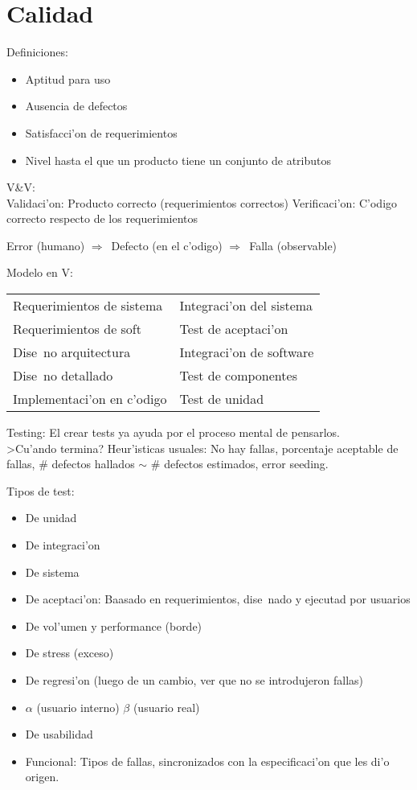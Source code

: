 \documentclass[a4paper,spanish]{article}
\newcommand{\tab}[0]{\hspace*{0.5cm}}
\newcommand{\then}[0]{\ensuremath{\Rightarrow}~}
\newenvironment{items}{
		\vspace*{-\topsep}
		\begin{itemize} 
		\addtolength{\itemsep}{-0.5\baselineskip}
		}{\end{itemize}\vspace*{-\topsep}}
\begin{document}
\section{Calidad}

Definiciones:
\begin{items}
\item Aptitud para uso
\item Ausencia de defectos
\item Satisfacci'on de requerimientos
\item Nivel hasta el que un producto tiene un conjunto de atributos
\end{items}

V\&V:\\
\tab Validaci'on: Producto correcto (requerimientos correctos)
\tab Verificaci'on: C'odigo correcto respecto de los requerimientos

Error (humano) \then Defecto (en el c'odigo) \then Falla (observable)

Modelo en V:\\
\begin{tabular}{ll}
Requerimientos de sistema    & \tab\tab\tab\tab Integraci'on del sistema \\
\tab Requerimientos de soft  & \tab\tab\tab Test de aceptaci'on \\
\tab\tab Dise~no arquitectura             & \tab\tab Integraci'on de software \\
\tab\tab\tab Dise~no detallado        & \tab Test de componentes \\
\tab\tab\tab\tab Implementaci'on en c'odigo     & Test de unidad \\
\end{tabular}

Testing: El crear tests ya ayuda por el proceso mental de pensarlos. \\
>Cu'ando termina? Heur'isticas usuales: No hay fallas, porcentaje aceptable de
fallas, \# defectos hallados $\sim$ \# defectos estimados, error seeding.

Tipos de test:
\begin{items}
\item De unidad
\item De integraci'on
\item De sistema
\item De aceptaci'on: Baasado en requerimientos, dise~nado y ejecutad por
	usuarios
\item De vol'umen y performance (borde)
\item De stress (exceso)
\item De regresi'on (luego de un cambio, ver que no se introdujeron fallas)
\item $\alpha$ (usuario interno) $\beta$ (usuario real)
\item De usabilidad
\item Funcional: Tipos de fallas, sincronizados con la especificaci'on que les
	di'o origen.
\end{items}
\end{document}
